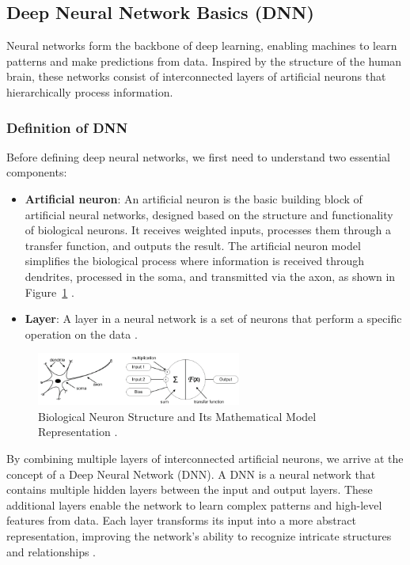 \subsection{Deep Neural Network Basics (DNN)}
Neural networks form the backbone of deep learning, enabling machines to learn patterns and make predictions from data. Inspired by the structure of the human brain, these networks consist of interconnected layers of artificial neurons that hierarchically process information.

\subsubsection{Definition of DNN}

Before defining deep neural networks, we first need to understand two essential components: 
\begin{itemize}
    \item \textbf{Artificial neuron}: An artificial neuron is the basic building block of artificial neural networks, designed based on the structure and functionality of biological neurons. It receives weighted inputs, processes them through a transfer function, and outputs the result. The artificial neuron model simplifies the biological process where information is received through dendrites, processed in the soma, and transmitted via the axon, as shown in Figure~\ref{fig:figure01} \parencite{krenker2011introduction}.
    
    \item \textbf{Layer}: A layer in a neural network is a set of neurons that perform a specific operation on the data \parencite{bengio2017deep}.
\end{itemize}

\begin{figure}[H] %
    \centering
    \includegraphics[width=0.6\textwidth]{chapters/chapter1/images/Figure01.png}
    \caption{Biological Neuron Structure and Its Mathematical Model Representation \parencite{krenker2011introduction}.}
    \label{fig:figure01}
\end{figure}


By combining multiple layers of interconnected artificial neurons, we arrive at the concept of a Deep Neural Network (DNN). A DNN is a neural network that contains multiple hidden layers between the input and output layers. These additional layers enable the network to learn complex patterns and high-level features from data. Each layer transforms its input into a more abstract representation, improving the network’s ability to recognize intricate structures and relationships \parencite{li2021water}.
